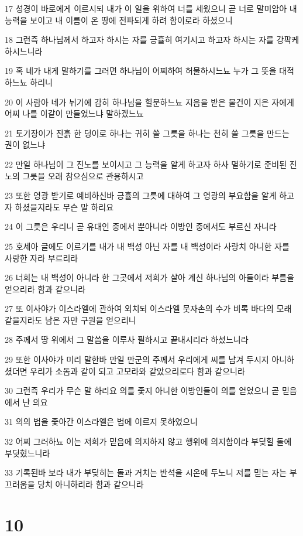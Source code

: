 \par 17 성경이 바로에게 이르시되 내가 이 일을 위하여 너를 세웠으니 곧 너로 말미암아 내 능력을 보이고 내 이름이 온 땅에 전파되게 하려 함이로라 하셨으니
\par 18 그런즉 하나님께서 하고자 하시는 자를 긍휼히 여기시고 하고자 하시는 자를 강퍅케 하시느니라
\par 19 혹 네가 내게 말하기를 그러면 하나님이 어찌하여 허물하시느뇨 누가 그 뜻을 대적하느뇨 하리니
\par 20 이 사람아 네가 뉘기에 감히 하나님을 힐문하느뇨 지음을 받은 물건이 지은 자에게 어찌 나를 이같이 만들었느냐 말하겠느뇨
\par 21 토기장이가 진흙 한 덩이로 하나는 귀히 쓸 그릇을 하나는 천히 쓸 그릇을 만드는 권이 없느냐
\par 22 만일 하나님이 그 진노를 보이시고 그 능력을 알게 하고자 하사 멸하기로 준비된 진노의 그릇을 오래 참으심으로 관용하시고
\par 23 또한 영광 받기로 예비하신바 긍휼의 그릇에 대하여 그 영광의 부요함을 알게 하고자 하셨을지라도 무슨 말 하리요
\par 24 이 그릇은 우리니 곧 유대인 중에서 뿐아니라 이방인 중에서도 부르신 자니라
\par 25 호세아 글에도 이르기를 내가 내 백성 아닌 자를 내 백성이라 사랑치 아니한 자를 사랑한 자라 부르리라
\par 26 너희는 내 백성이 아니라 한 그곳에서 저희가 살아 계신 하나님의 아들이라 부름을 얻으리라 함과 같으니라
\par 27 또 이사야가 이스라엘에 관하여 외치되 이스라엘 뭇자손의 수가 비록 바다의 모래 같을지라도 남은 자만 구원을 얻으리니
\par 28 주께서 땅 위에서 그 말씀을 이루사 필하시고 끝내시리라 하셨느니라
\par 29 또한 이사야가 미리 말한바 만일 만군의 주께서 우리에게 씨를 남겨 두시지 아니하셨더면 우리가 소돔과 같이 되고 고모라와 같았으리로다 함과 같으니라
\par 30 그런즉 우리가 무슨 말 하리요 의를 좇지 아니한 이방인들이 의를 얻었으니 곧 믿음에서 난 의요
\par 31 의의 법을 좇아간 이스라엘은 법에 이르지 못하였으니
\par 32 어찌 그러하뇨 이는 저희가 믿음에 의지하지 않고 행위에 의지함이라 부딪힐 돌에 부딪혔느니라
\par 33 기록된바 보라 내가 부딪히는 돌과 거치는 반석을 시온에 두노니 저를 믿는 자는 부끄러움을 당치 아니하리라 함과 같으니라

\chapter{10}


